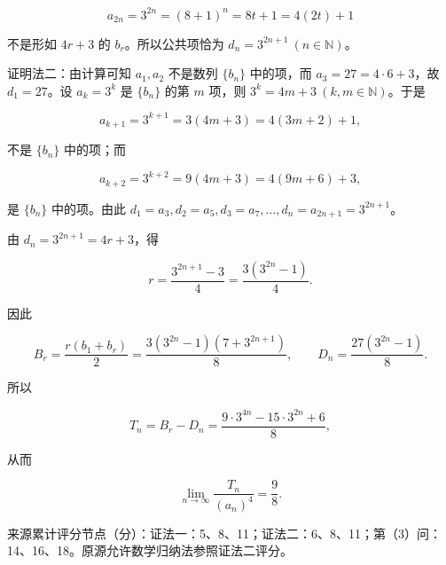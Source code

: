 \begin{answer}
\nopagebreak[4]
\[
a_{2n}=3^{2n}=(8+1)^n=8t+1=4(2t)+1
\]

不是形如 $4r+3$ 的 $b_r$。所以公共项恰为 $d_n=3^{2n+1}\ (n\in\mathbb N)$。

证明法二：由计算可知 $a_1,a_2$ 不是数列 $\{b_n\}$ 中的项，而 $a_3=27=4\cdot6+3$，故 $d_1=27$。设 $a_k=3^k$ 是 $\{b_n\}$ 的第 $m$ 项，则 $3^k=4m+3\ (k,m\in\mathbb N)$。于是

\nopagebreak[4]
\[
a_{k+1}=3^{k+1}=3(4m+3)=4(3m+2)+1,
\]

不是 $\{b_n\}$ 中的项；而

\nopagebreak[4]
\[
a_{k+2}=3^{k+2}=9(4m+3)=4(9m+6)+3,
\]

是 $\{b_n\}$ 中的项。由此 $d_1=a_3,d_2=a_5,d_3=a_7,\ldots,d_n=a_{2n+1}=3^{2n+1}$。


由 $d_n=3^{2n+1}=4r+3$，得

\nopagebreak[4]
\[
r=\dfrac{3^{2n+1}-3}{4}=\dfrac{3(3^{2n}-1)}4.
\]

因此

\nopagebreak[4]
\[
B_r=\dfrac{r(b_1+b_r)}2
=\dfrac{3(3^{2n}-1)(7+3^{2n+1})}{8},
\qquad
D_n=\dfrac{27(3^{2n}-1)}8.
\]

所以

\nopagebreak[4]
\[
T_n=B_r-D_n=\dfrac{9\cdot3^{4n}-15\cdot3^{2n}+6}{8},
\]

从而

\nopagebreak[4]
\[
\lim_{n\to\infty}\dfrac{T_n}{(a_n)^4}=\dfrac98.
\]

来源累计评分节点（分）：证法一：5、8、11；证法二：6、8、11；第（3）问：14、16、18。原源允许数学归纳法参照证法二评分。




\end{answer}